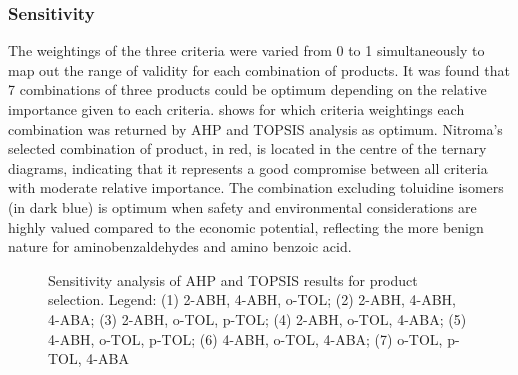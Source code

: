 
\subsubsection{Sensitivity}

The weightings of the three criteria were varied from 0 to 1 simultaneously to map out the range of validity for each combination of products. It was found that 7 combinations of three products could be optimum depending on the relative importance given to each criteria.  shows for which criteria weightings each combination was returned by AHP and TOPSIS analysis as optimum. Nitroma's selected combination of product, in red, is located in the centre of the ternary diagrams, indicating that it represents a good compromise between all criteria with moderate relative importance. The combination excluding toluidine isomers (in dark blue) is optimum when safety and environmental considerations are highly valued compared to the economic potential, reflecting the more benign nature for aminobenzaldehydes and amino benzoic acid. 

\begin{figure}[h]
    \centering
    \qquad
    \caption{Sensitivity analysis of AHP and TOPSIS results for product selection. Legend: (1) 2-ABH, 4-ABH, o-TOL; (2) 2-ABH, 4-ABH, 4-ABA; (3) 2-ABH, o-TOL, p-TOL; (4) 2-ABH, o-TOL, 4-ABA; (5) 4-ABH, o-TOL, p-TOL; (6) 4-ABH, o-TOL, 4-ABA; (7) o-TOL, p-TOL, 4-ABA}%
    \label{fig:sensitivity_product}%
\end{figure}

